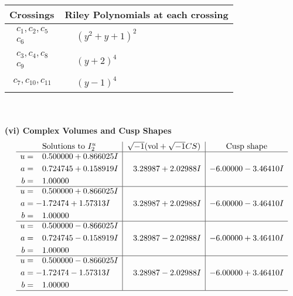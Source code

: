\documentclass[1p]{elsarticle_modified}
\theoremstyle{definition}
\newcommand{\I}{\sqrt{-1}}
\begin{document}
\begin{tabular}{m{50pt}|m{274pt}}
Crossings & \hspace{64pt}Riley Polynomials at each crossing \\
\hline $$\begin{aligned}c_{1},c_{2},c_{5}\\c_{6}\end{aligned}$$&$\begin{aligned}
&(y^2+y+1)^2
\end{aligned}$\\
\hline $$\begin{aligned}c_{3},c_{4},c_{8}\\c_{9}\end{aligned}$$&$\begin{aligned}
&(y+2)^4
\end{aligned}$\\
\hline $$\begin{aligned}c_{7},c_{10},c_{11}\end{aligned}$$&$\begin{aligned}
&(y-1)^4
\end{aligned}$\\
\hline
\end{tabular}\\~\\
\newpage\flushleft \textbf{(vi) Complex Volumes and Cusp Shapes}
$$\begin{array}{c|c|c}  
\text{Solutions to }I^u_{2}& \I (\text{vol} + \sqrt{-1}CS) & \text{Cusp shape}\\
 \hline 
\begin{aligned}
u &= \phantom{-}0.500000 + 0.866025 I \\
a &= \phantom{-}0.724745 + 0.158919 I \\
b &= \phantom{-}1.00000\phantom{ +0.000000I}\end{aligned}
 & \phantom{-}3.28987 + 2.02988 I & -6.00000 - 3.46410 I \\ \hline\begin{aligned}
u &= \phantom{-}0.500000 + 0.866025 I \\
a &= -1.72474 + 1.57313 I \\
b &= \phantom{-}1.00000\phantom{ +0.000000I}\end{aligned}
 & \phantom{-}3.28987 + 2.02988 I & -6.00000 - 3.46410 I \\ \hline\begin{aligned}
u &= \phantom{-}0.500000 - 0.866025 I \\
a &= \phantom{-}0.724745 - 0.158919 I \\
b &= \phantom{-}1.00000\phantom{ +0.000000I}\end{aligned}
 & \phantom{-}3.28987 - 2.02988 I & -6.00000 + 3.46410 I \\ \hline\begin{aligned}
u &= \phantom{-}0.500000 - 0.866025 I \\
a &= -1.72474 - 1.57313 I \\
b &= \phantom{-}1.00000\phantom{ +0.000000I}\end{aligned}
 & \phantom{-}3.28987 - 2.02988 I & -6.00000 + 3.46410 I\\
 \hline 
 \end{array}$$\newpage\newpage\renewcommand{\arraystretch}{1}
\end{document}
